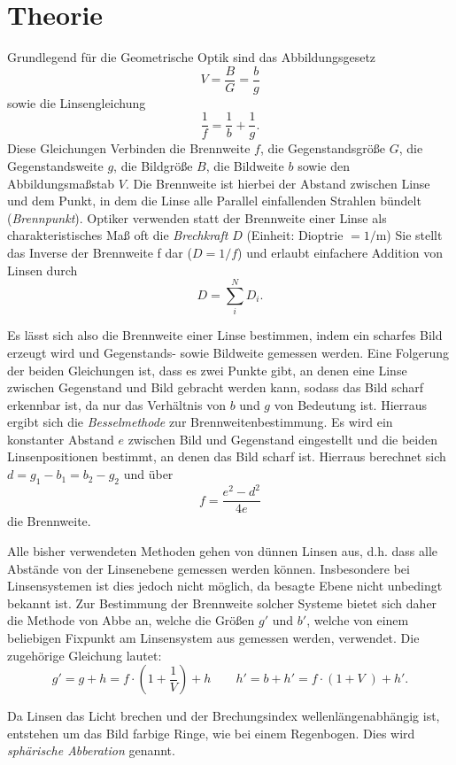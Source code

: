 \section{Theorie}
\label{sec:Theorie}
Grundlegend für die Geometrische Optik sind das Abbildungsgesetz
\begin{equation}
  V = \frac{B}{G} = \frac{b}{g}
  \label{eqn:AG}
\end{equation}
sowie die Linsengleichung
\begin{equation}
  \frac{1}{f} = \frac{1}{b} + \frac{1}{g}.
  \label{eqn:LG}
\end{equation}
Diese Gleichungen Verbinden die Brennweite $f$, die Gegenstandsgröße $G$, die Gegenstandsweite $g$, die Bildgröße $B$, die Bildweite $b$ sowie den Abbildungsmaßstab $V$. Die Brennweite ist hierbei der Abstand zwischen Linse und dem Punkt, in dem die Linse alle Parallel einfallenden Strahlen bündelt (\textit{Brennpunkt}).
Optiker verwenden statt der Brennweite einer Linse als charakteristisches Maß oft die \textit{Brechkraft} $D$ (Einheit: Dioptrie $=1/\si{\meter}$)
Sie stellt das Inverse der Brennweite f dar ($D = 1/f$) und erlaubt einfachere Addition von Linsen durch
\begin{equation}
   D =  \sum_i ^N D_i.
  \label{eqn:D}
\end{equation}

Es lässt sich also die Brennweite einer Linse bestimmen, indem ein scharfes Bild erzeugt wird und Gegenstands- sowie Bildweite gemessen werden.
Eine Folgerung der beiden Gleichungen ist, dass es zwei Punkte gibt, an denen eine Linse zwischen Gegenstand und Bild gebracht werden kann, sodass das Bild scharf erkennbar ist, da nur das Verhältnis von $b$ und $g$ von Bedeutung ist.
Hierraus ergibt sich die \textit{Besselmethode} zur Brennweitenbestimmung. Es wird ein konstanter Abstand $e$ zwischen Bild und Gegenstand eingestellt und die beiden Linsenpositionen bestimmt, an denen das Bild scharf ist. Hierraus berechnet sich $d = g_1 -b_1 = b_2 - g_2$ und über
\begin{equation}
  f = \frac{e^2 - d^2}{4e}
  \label{eqn:bessel}
\end{equation}
die Brennweite.

Alle bisher verwendeten Methoden gehen von dünnen Linsen aus, d.h. dass alle Abstände von der Linsenebene gemessen werden können. Insbesondere bei Linsensystemen ist dies jedoch nicht möglich, da besagte Ebene nicht unbedingt bekannt ist. Zur Bestimmung der Brennweite solcher Systeme bietet sich daher die Methode von Abbe an, welche die Größen $g'$ und $b'$, welche von einem beliebigen Fixpunkt am Linsensystem aus gemessen werden, verwendet. Die zugehörige Gleichung lautet:
\begin{equation}
  g' = g + h = f \cdot \left( 1 + \frac{1}{V}\right) + h
  \qquad
  h' = b + h' = f \cdot \left( 1+ V \;\right) + h'.
  \label{eqn:abbe}
\end{equation}

Da Linsen das Licht brechen und der Brechungsindex wellenlängenabhängig ist, entstehen um das Bild farbige Ringe, wie bei einem Regenbogen. Dies wird \textit{sphärische Abberation} genannt.
